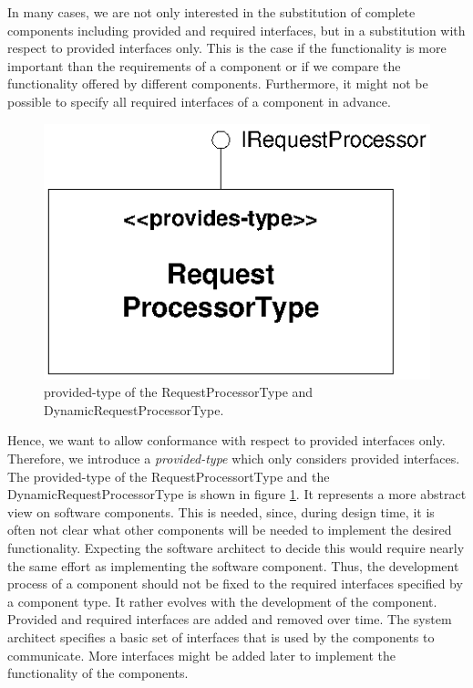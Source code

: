 In many cases, we are not only interested in the substitution of complete components including provided and required interfaces, but in a substitution with respect to provided interfaces only. This is the case if the functionality is more important than the requirements of a component or if we compare the functionality offered by different components. Furthermore, it might not be possible to specify all required interfaces of a component in advance. 

\begin{figure}[htbp]
\centering
\includegraphics[scale=0.85]{example/ProvidesType}
\caption{provided-type of the RequestProcessorType and DynamicRequestProcessorType.}
\label{fig:ProvidesType}
\end{figure}

Hence, we want to allow conformance with respect to provided interfaces only. Therefore, we introduce a \emph{provided-type} which only considers provided interfaces. The provided-type of the RequestProcessortType and the DynamicRequestProcessorType is shown in figure \ref{fig:ProvidesType}. 
It represents a more abstract view on software components. This is needed, since, during design time, it is often not clear what other components will be needed to implement the desired functionality. Expecting the software architect to decide this would require nearly the same effort as implementing the software component. Thus, the development process of a component should not be fixed to the required interfaces specified by a component type. It rather evolves with the development of the component. Provided and required interfaces are added and removed over time. The system architect specifies a basic set of interfaces that is used by the components to communicate. More interfaces might be added later to implement the functionality of the components.

